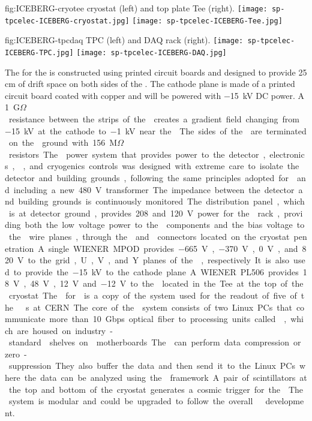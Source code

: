 \begin{dunefigure}
  {fig:ICEBERG-cryotee}
	{ cryostat (left) and top plate Tee (right).}
  \texttt{[image: sp-tpcelec-ICEBERG-cryostat.jpg]}
  \texttt{[image: sp-tpcelec-ICEBERG-Tee.jpg]}
\end{dunefigure}

\begin{dunefigure}
  {fig:ICEBERG-tpcdaq}
	{ TPC (left) and DAQ rack (right).}
  \texttt{[image: sp-tpcelec-ICEBERG-TPC.jpg]}
  \texttt{[image: sp-tpcelec-ICEBERG-DAQ.jpg]}
\end{dunefigure}

The  for the  is constructed using printed circuit boards and 
designed to provide 25 cm of drift space on both sides of the . The cathode 
plane is made of a printed circuit board coated with copper and will be powered with 
\SI{-15}{kV} DC power. A \SI{1}{G$\Omega$} resistance between the strips of the 
creates a gradient field changing from \SI{-15}{kV} at the cathode to \SI{-1}{kV} near the 
. The sides of the  are terminated on the 
ground with \SI{156}{M$\Omega$} resistors. 

The  power system that provides power to the detector, electronics, 
, and cryogenics controls was designed with extreme care to 
isolate the detector and building grounds, following the same principles adopted
for  and including a new \SI{480}{V} transformer. The impedance between the detector
and building grounds is continuously monitored. The distribution panel, which is 
at detector ground, provides 208 and \SI{120}{V} power for the  rack, 
providing both the low voltage power to the  components and the bias 
voltage to the  wire planes, through the  and 
connectors located on the cryostat penetration. A single WIENER MPOD provides 
\SI{-665}{V}, \SI{-370}{V}, \SI{0}{V}, and \SI{820}{V} to the grid, U, V, and 
Y planes of the , respectively. It is also used to provide the 
\SI{-15}{kV} to the cathode plane. A WIENER PL506 provides \SI{18}{V}, 
\SI{48}{V}, \SI{12}{V} and \SI{-12}{V} to the  located in the 
Tee at the top of the cryostat. 

The  for  is a copy of the system used for the readout
of five of the  s at CERN. The core of the  system 
consists of two Linux PCs that communicate more than 10 Gbps optical fiber
to processing units called , which are 
housed on industry-standard  shelves on  motherboards.
The  can perform data compression or zero-suppression. They also buffer
the data and then send it to the Linux PCs where the data can be analyzed 
using the  framework. A pair of scintillators at the top and bottom 
of the cryostat generates a cosmic trigger for the .
The system is modular and could be upgraded to follow the overall   
development. 

